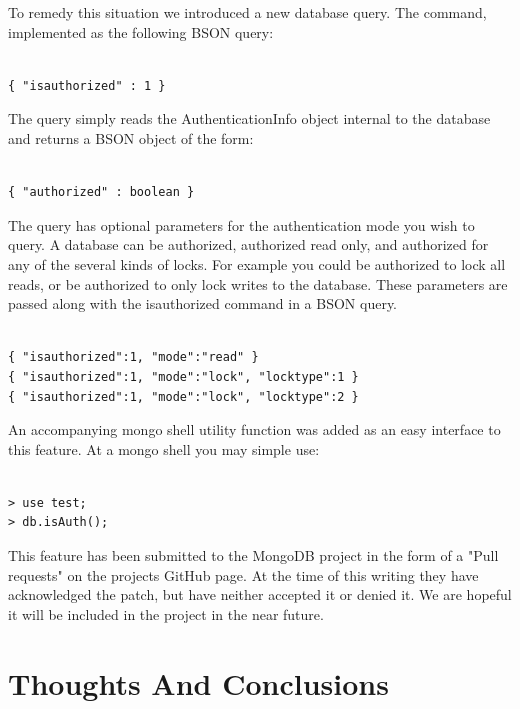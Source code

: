 \documentclass{../dependencies/acm_proc_article-sp}
\begin{document}
To remedy this situation we introduced a new database query.
The command, implemented as the following BSON query:
\begin{lstlisting}

{ "isauthorized" : 1 }
\end{lstlisting}

The query simply reads the AuthenticationInfo object internal to the database
and returns a BSON object of the form:
\begin{lstlisting}

{ "authorized" : boolean }
\end{lstlisting}

The query has optional parameters for the authentication mode you wish to query.
A database can be authorized, authorized read only, and authorized for any
of the several kinds of locks. For example you could be authorized to lock all
reads, or be authorized to only lock writes to the database.
These parameters are passed along with the isauthorized command in a BSON query.
\begin{lstlisting}

{ "isauthorized":1, "mode":"read" }
{ "isauthorized":1, "mode":"lock", "locktype":1 }
{ "isauthorized":1, "mode":"lock", "locktype":2 }
\end{lstlisting}

An accompanying mongo shell utility function was added as an easy
interface to this feature. At a mongo shell you may simple use:
\begin{lstlisting}

> use test;
> db.isAuth();
\end{lstlisting}

This feature has been submitted to the MongoDB project in the form
of a "Pull requests" on the projects GitHub page. \cite{4}
At the time of this writing they have acknowledged the patch, but have
neither accepted it or denied it. We are hopeful it will be included
in the project in the near future.

\section{Thoughts And Conclusions }

\newpage
%

%
%
\balancecolumns
\end{document}
